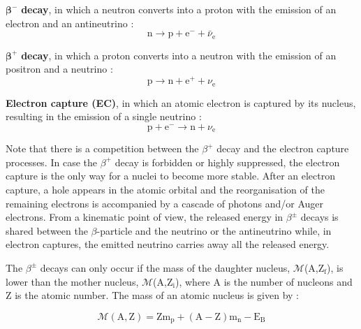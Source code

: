 \documentclass[main.tex]{subfiles}
\begin{document}
\NI $\boldsymbol{\beta^-}$ \textbf{decay}, in which a neutron converts into a proton with the emission of an electron and an antineutrino :
\begin{equation}
\text{n} \rightarrow \text{p} + \text{e}^- + \bar{\nu}_\text{e}
\end{equation}


\bigskip


\NI $\boldsymbol{\beta^+}$ \textbf{decay}, in which a proton converts into a neutron with the emission of an positron and a neutrino :
\begin{equation}
\text{p} \rightarrow \text{n} + \text{e}^+ + \nu_\text{e}
\end{equation} 


\bigskip 

 
\NI \textbf{Electron capture (EC)}, in which an atomic electron is captured by its nucleus, resulting in the emission of a single neutrino :
\begin{equation}
\text{p} + \text{e}^- \rightarrow \text{n} + \nu_{\text{e}}
\end{equation} 


\bigskip
 

\NI Note that there is a competition between the $\beta^+$ decay and the electron capture processes. In case the $\beta^+$ decay is forbidden or highly suppressed, the electron capture is the only way for a nuclei to become more stable. After an electron capture, a hole appears in the atomic orbital and the reorganisation of the remaining electrons is accompanied by a cascade of photons and/or Auger electrons. From a kinematic point of view, the released energy in $\beta^{\pm}$ decays is shared between the $\beta$-particle and the neutrino or the antineutrino while, in electron captures, the emitted neutrino carries away all the released energy. 


\bigskip


\NI The $\beta^{\pm}$ decays can only occur if the mass of the daughter nucleus, $\mathcal{M}$(A,Z$_\text{f}$), is lower than the mother nucleus, $\mathcal{M}$(A,Z$_\text{i}$), where A is the number of nucleons and Z is the atomic number. The mass of an atomic nucleus is given by : 


\begin{equation}\label{eq:Mass}
\mathcal{M} (\text{A},\text{Z}) = \text{Z} \text{m}_\text{p} + (\text{A}-\text{Z}) \text{m}_\text{n} - \text{E}_\text{B}
\end{equation}


\bigskip
\end{document}
